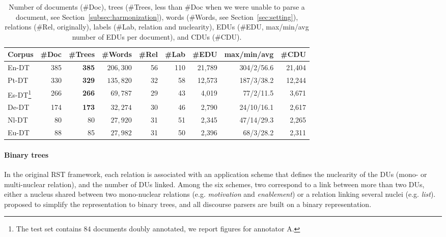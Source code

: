 \documentclass[11pt]{article}
\newcommand{\erstdt}{En-DT}
\newcommand{\derst}{De-DT}
\newcommand{\ptrst}{Pt-DT}
\newcommand{\barst}{Eu-DT}
\newcommand{\sprst}{Es-DT}
\newcommand{\nlrst}{Nl-DT}
\newcommand{\rel}[1]{\textit{#1}}
\begin{document}
\begin{table*}[ht!]
\begin{tabular}{lrrrrrrrr}
\toprule
Corpus              & \#Doc         & \#Trees   & \#Words          & \#Rel & \#Lab  & \#EDU  & max/min/avg & \#CDU  \\
\midrule
\erstdt 			& 385           & {\bf 385}       & $206,300$         &56&  110 & 21,789 & 304/2/56.6   & 21,404  \\
\ptrst 				& 330 			& {\bf 329} 		& $135,820$	& 32 &  58	& 12,573 & 187/3/38.2 & 12,244 \\
\sprst\footnote{The test set contains $84$ documents doubly annotated, we report figures for annotator A. 
}
                    & 266           & {\bf 266}       & $69,787$          & 29    &  43       & 4,019 & 77/2/11.5     &  3,671  \\
\derst 				& 174           & {\bf 173}       & $32,274$          & 30    &  46       & 2,790 & 24/10/16.1    & 2,617  \\
\nlrst              & 80            & 80        & $27,920$          & 31    &  51       & 2,345 & 47/14/29.3    &  2,265  \\
\barst  		    & 88            & 85        & $27,982$          & 31    &  50       & 2,396 & 68/3/28.2     & 2,311   \\
\bottomrule
\end{tabular}
\caption{Number of documents (\#Doc), trees (\#Trees, less than \#Doc when we were unable to parse a document, see Section~\ref{subsec:harmonization}), words (\#Words, see Section~\ref{sec:setting}), relations (\#Rel, originally), labels (\#Lab, relation and nuclearity), EDUs (\#EDU, max/min/avg number of EDUs per document), and CDUs (\#CDU).
}
\label{table:stats}
\end{table*}



\paragraph{Binary trees}
In the original RST framework, each relation is associated with an application scheme that defines the nuclearity of the DUs (mono- or multi-nuclear relation), and the number of DUs linked.
Among the six schemes, two correspond to a link between more than two DUs, either a nucleus shared between two mono-nuclear relations (e.g. \rel{motivation} and \rel{enablement}) or a relation linking several nuclei (e.g. \rel{list}). 
 proposed to simplify the representation to binary trees, and all discourse parsers are built on a binary representation. 
\end{document}
